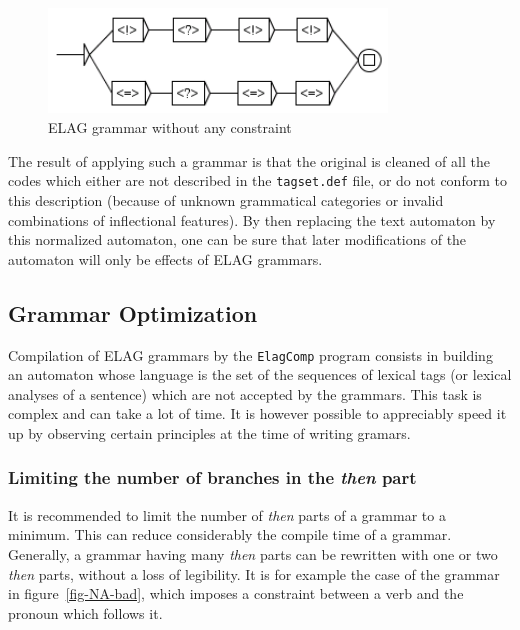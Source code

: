\begin{figure}[!h]
\begin{center}
\includegraphics[width=9cm]{resources/img/fig7-20.png}
\caption{ELAG grammar without any constraint\label{fig-elag-norm}}
\end{center}
\end{figure}

\bigskip
\noindent The result of applying such a grammar is that the
original is cleaned of all the codes which either are not described in the \verb$tagset.def$
file, or do not conform to this description
(because of unknown grammatical categories or invalid combinations of
inflectional features). By then replacing the text automaton by this normalized
automaton, one can be sure that later modifications of the automaton will only be
effects of ELAG grammars.


\subsection{Grammar Optimization}
Compilation of ELAG grammars by the \verb+ElagComp+ program
 consists in building an automaton
whose language is the set of the sequences of lexical tags (or lexical analyses of a sentence) which
are not accepted by the grammars. This task is complex and can take a lot of
time. It is however possible to appreciably speed it up by observing certain
principles at the time of writing gramars.

\subsubsection{Limiting the number of branches in the \textit{then} part}
It is recommended to limit the number of \textit{then} parts of a grammar to a
minimum. This can reduce considerably the compile time of a grammar. Generally, a grammar
having many \textit{then} parts can be rewritten with one or two \textit{then} parts, without a
loss of legibility. It is for example the case of the grammar in
figure~\ref{fig-NA-bad}, which imposes a constraint between a verb and the
pronoun which follows it.

